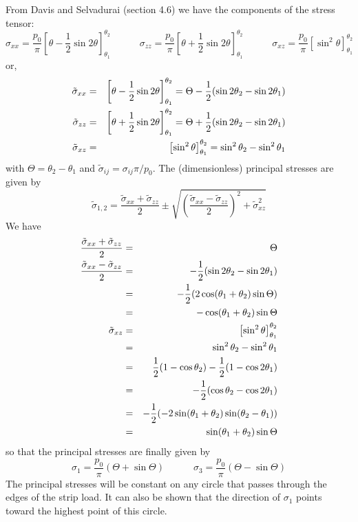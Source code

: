 From Davis and Selvadurai \cite{dase96}(section 4.6) we have the components of the stress tensor:
\[
\sigma_{xx}=\frac{p_0}{\pi}\left[ \theta - \frac{1}{2}\sin 2\theta  \right]^{\theta_2}_{\theta_1}
\quad\quad\quad
\sigma_{zz}=\frac{p_0}{\pi}\left[ \theta + \frac{1}{2}\sin 2\theta  \right]^{\theta_2}_{\theta_1}
\quad\quad\quad
\sigma_{xz}=\frac{p_0}{\pi}\left[ \sin^2 \theta  \right]^{\theta_2}_{\theta_1}
\]
or, 
\begin{eqnarray}
\tilde{\sigma}_{xx}&=&\left[ \theta - \frac{1}{2}\sin 2\theta  \right]^{\theta_2}_{\theta_1} = \Theta - \frac{1}{2} ( \sin 2\theta_2 - \sin 2\theta_1) \nonumber\\
\tilde{\sigma}_{zz}&=&\left[ \theta + \frac{1}{2}\sin 2\theta  \right]^{\theta_2}_{\theta_1} = \Theta + \frac{1}{2} ( \sin 2\theta_2 - \sin 2\theta_1) \nonumber\\
\tilde{\sigma}_{xz}&=&\left[ \sin^2 \theta  \right]^{\theta_2}_{\theta_1} =  \sin^2 \theta_2 - \sin^2 \theta_1 \nonumber
\end{eqnarray}
with $\Theta=\theta_2-\theta_1$ and $\tilde{\sigma}_{ij}=\sigma_{ij}\pi/p_0$.
The (dimensionless) principal stresses are given by 
\[
\tilde{\sigma}_{1,2}=\frac{\tilde{\sigma}_{xx}+\tilde{\sigma}_{zz}}{2} \pm \sqrt{  \left(\frac{\tilde{\sigma}_{xx}-\tilde{\sigma}_{zz}}{2}\right)^2 +\tilde{\sigma}_{xz}^2 }
\]
We have
\begin{eqnarray}
\frac{\tilde{\sigma}_{xx}+\tilde{\sigma}_{zz}}{2} &=&  \Theta 
\nonumber\\
\frac{\tilde{\sigma}_{xx}-\tilde{\sigma}_{zz}}{2}
&=&  -\frac{1}{2} (  \sin 2\theta_2 - \sin 2\theta_1 ) \nonumber\\
&=&  -\frac{1}{2} ( 2 \cos (\theta_1+\theta_2) \sin \Theta ) \nonumber\\ 
&=&  -\cos (\theta_1+\theta_2) \sin \Theta  \nonumber\\ 
\tilde{\sigma}_{xz}
&=&\left[ \sin^2 \theta  \right]^{\theta_2}_{\theta_1}  \nonumber\\
&=&\sin^2 \theta_2 - \sin^2 \theta_1 \nonumber\\
&=&\frac{1}{2} (1-\cos \theta_2) - \frac{1}{2} (1-\cos 2\theta_1) \nonumber\\
&=& -\frac{1}{2} (\cos \theta_2 - \cos 2\theta_1) \nonumber\\
&=& -\frac{1}{2} ( -2 \sin (\theta_1+\theta_2) \sin(\theta_2-\theta_1) ) \nonumber\\
&=& \sin (\theta_1+\theta_2) \sin \Theta \nonumber
\end{eqnarray}
so that the principal stresses are finally given by
\[
\sigma_1 = \frac{p_0}{\pi} ( \Theta + \sin \Theta) 
\quad\quad\quad
\sigma_3 = \frac{p_0}{\pi} ( \Theta - \sin \Theta) 
\]
The principal stresses will be constant on any circle that passes through the edges of the 
strip load. It can also be shown that the direction of $\sigma_1$ points toward the highest 
point of this circle.

